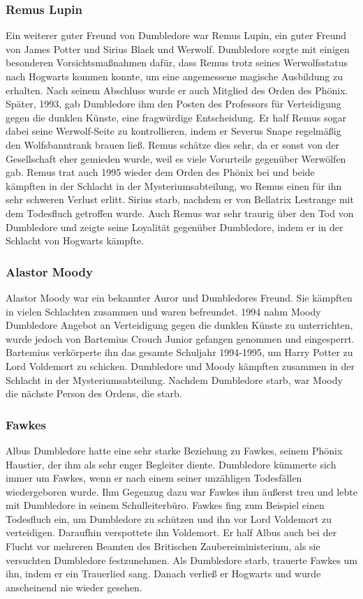 \documentclass[a4paper, 10pt]{article}
\begin{document}
\subsubsection*{\large Remus Lupin}
Ein weiterer guter Freund von Dumbledore war Remus Lupin, ein guter Freund von James Potter und Sirius Black und Werwolf. Dumbledore sorgte mit einigen besonderen Vorsichtsmaßnahmen dafür, dass Remus trotz seines Werwolfsstatus nach Hogwarts kommen konnte, um eine angemessene magische Ausbildung zu erhalten. Nach seinem Abschluss wurde er auch Mitglied des Orden des Phönix. Später, 1993, gab Dumbledore ihm den Posten des Professors für Verteidigung gegen die dunklen Künste, eine fragwürdige Entscheidung. Er half Remus sogar dabei seine Werwolf-Seite zu kontrollieren, indem er Severus Snape regelmäßig den Wolfsbanntrank brauen ließ. Remus schätze dies sehr, da er sonst von der Gesellschaft eher gemieden wurde, weil es viele Vorurteile gegenüber Werwölfen gab. Remus trat auch 1995 wieder dem Orden des Phönix bei und beide kämpften in der Schlacht in der Mysteriumsabteilung, wo Remus einen für ihn sehr schweren Verlust erlitt. Sirius starb, nachdem er von Bellatrix Lestrange mit dem Todesfluch getroffen wurde. Auch Remus war sehr traurig über den Tod von Dumbledore
und zeigte seine Loyalität gegenüber Dumbledore, indem er in der Schlacht von Hogwarts kämpfte.
\subsubsection*{\large Alastor Moody}
Alastor Moody war ein bekannter Auror und Dumbledores Freund. Sie kämpften in vielen Schlachten zusammen und waren befreundet. 1994 nahm Moody Dumbledore Angebot an Verteidigung gegen die dunklen Künste zu unterrichten, wurde jedoch von Bartemius Crouch Junior gefangen genommen und eingesperrt. Bartemius verkörperte ihn das gesamte Schuljahr 1994-1995, um Harry Potter zu Lord Voldemort zu schicken.
\vspace{10pt}
\newline
Dumbledore und Moody kämpften zusammen in der Schlacht in der Mysteriumsabteilung. Nachdem Dumbledore starb, war Moody die nächste Person des Ordens, die starb.
\subsubsection*{\large Fawkes}
Albus Dumbledore hatte eine sehr starke Beziehung zu Fawkes, seinem Phönix Haustier, der ihm als sehr enger Begleiter diente. Dumbledore kümmerte sich immer um Fawkes, wenn er nach einem seiner unzähligen Todesfällen wiedergeboren wurde. Ihm Gegenzug dazu war Fawkes ihm äußerst treu und lebte mit Dumbledore in seinem Schulleiterbüro. Fawkes fing zum Beispiel einen Todesfluch ein, um Dumbledore zu schützen und ihn vor Lord Voldemort zu verteidigen. Daraufhin verspottete ihn Voldemort. Er half Albus auch bei der Flucht vor mehreren Beamten des Britischen Zaubereiministerium, als sie versuchten Dumbledore festzunehmen. Als Dumbledore starb, trauerte Fawkes um ihn, indem er ein Trauerlied sang. Danach verließ er Hogwarts und wurde anscheinend nie wieder gesehen.
\end{document}
